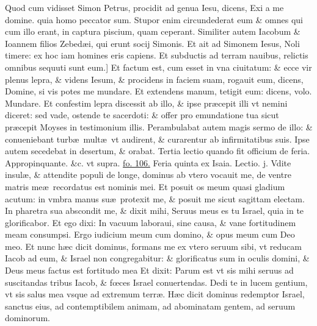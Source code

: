 \documentclass[a5paper,10pt]{book}
\def\leftmarginnote{%
	\lrmarginnote{\hskip -\marginparsep \hskip -6.5em}}
\def\rightmarginnote{%
	\lrmarginnote{\hskip\columnwidth \hskip -1em}}
\def\ae{æ}
\def\oe{œ}
\begin{document}
\begin{multicols*}{2}
Quod cum vidisset Simon Petrus, procidit ad genua Iesu, dicens, Exi a me domine. quia homo peccator sum.
Stupor enim circundederat eum \& omnes qui cum illo erant, in captura piscium, quam ceperant.
Similiter autem Iacobum \& Ioannem filios Zebed\ae i, qui erunt socij Simonis.
Et ait ad Simonem Iesus, Noli timere: ex hoc iam homines eris capiens.
Et subductis ad terram nauibus, relictis omnibus sequuti sunt eum.]
Et\leftmarginnote{\begin{flushright}B\end{flushright}} factum est, cum esset in vna ciuitatum: \& ecce vir plenus lepra, \& videns Iesum, \& procidens in faciem suam, rogauit eum, dicens, Domine, si vis potes me mundare.
Et extendens manum, tetigit eum: dicens, volo.
Mundare. Et confestim lepra discessit ab illo, \& ipse pr\ae cepit illi vt nemini diceret: sed vade, ostende te sacerdoti: \& offer pro emundatione tua sicut pr\ae cepit Moyses in testimonium illis.
Perambulabat autem magis sermo de illo: \& conueniebant turb\ae \ mult\ae \ vt audirent, \& curarentur ab infirmitatibus suis.
Ipse autem secedebat in desertum, \& orabat.
\newline \color{red} Tertia lectio quando fit officium de feria. \color{black} Appropinquante. \&c. \color{red} vt supra. \color{black} \hyperlink{page.106}{fo. 106.}
\newline {} \color{red} \hypertarget{THU-SECUNDA-ADV}{Feria quinta} ex Isaia. \hfill Lectio. j. \color{black}
\vspace{-.25em}
\textdagger Vdite\rightmarginnote{c. 49.\\a} insul\ae , \& attendite populi de longe, dominus ab vtero vocauit me, de ventre matris me\ae \ recordatus est nominis mei.
Et posuit os meum quasi gladium acutum: in vmbra manus su\ae \ protexit me, \& posuit me sicut sagittam electam.
In pharetra sua abscondit me, \& dixit mihi, Seruus meus es tu Israel, quia in te glorificabor.
Et ego dixi: In vacuum laboraui, sine causa, \& vane fortitudinem meam consumpsi.
Ergo iudicium meum cum domino, \& opus meum cum Deo meo.
Et nunc h\ae c dicit dominus, formans me ex vtero seruum sibi, vt reducam Iacob ad eum, \& Israel non congregabitur: \& glorificatus sum in oculis domini, \& Deus meus factus est fortitudo mea
Et dixit: Parum est vt sis mihi seruus ad suscitandas tribus Iacob, \& f\oe ces Israel conuertendas.
Dedi te in lucem gentium, vt sis salus mea vsque ad extremum terr\ae .
H\ae c dicit dominus redemptor Israel, sanctus eius, ad contemptibilem animam, ad abominatam gentem, ad seruum dominorum. 

\end{multicols*}
\end{document}
